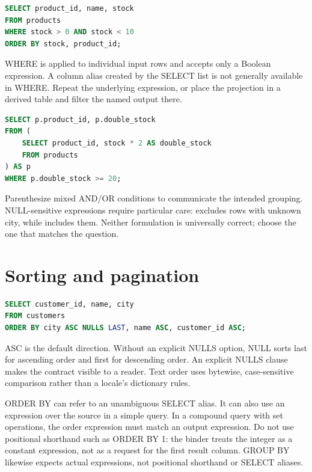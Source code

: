 \begin{lstlisting}[language=SQL]
SELECT product_id, name, stock
FROM products
WHERE stock > 0 AND stock < 10
ORDER BY stock, product_id;
\end{lstlisting}

WHERE is applied to individual input rows and accepts only a Boolean expression. A column alias created by the SELECT list is not generally available in WHERE. Repeat the underlying expression, or place the projection in a derived table and filter the named output there.

\begin{lstlisting}[language=SQL]
SELECT p.product_id, p.double_stock
FROM (
    SELECT product_id, stock * 2 AS double_stock
    FROM products
) AS p
WHERE p.double_stock >= 20;
\end{lstlisting}

Parenthesize mixed AND/OR conditions to communicate the intended grouping. NULL-sensitive expressions require particular care:  excludes rows with unknown city, while  includes them. Neither formulation is universally correct; choose the one that matches the question.

\section{Sorting and pagination}
\label{sql:ordering}

\begin{lstlisting}[language=SQL]
SELECT customer_id, name, city
FROM customers
ORDER BY city ASC NULLS LAST, name ASC, customer_id ASC;
\end{lstlisting}

ASC is the default direction. Without an explicit NULLS option, NULL sorts last for ascending order and first for descending order. An explicit NULLS clause makes the contract visible to a reader. Text order uses bytewise, case-sensitive comparison rather than a locale's dictionary rules.

ORDER BY can refer to an unambiguous SELECT alias. It can also use an expression over the source in a simple query. In a compound query with set operations, the order expression must match an output expression. Do not use positional shorthand such as ORDER BY 1: the binder treats the integer as a constant expression, not as a request for the first result column. GROUP BY likewise expects actual expressions, not positional shorthand or SELECT aliases.

